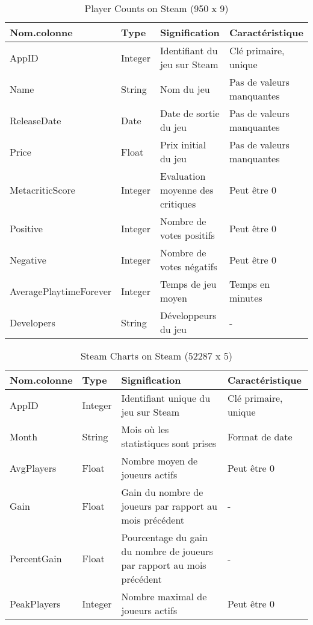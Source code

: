 \documentclass[mstat,12pt]{unswthesis}
\begin{document}
\begin{longtable}[t]{l>{\raggedright\arraybackslash}p{1cm}>{\raggedright\arraybackslash}p{4cm}>{\raggedright\arraybackslash}p{4cm}}
\caption{\label{tab:recuperation donnée}Player Counts on Steam (950 x 9)}\\
\toprule
Nom.colonne & Type & Signification & Caractéristique\\
\midrule
AppID & Integer & Identifiant du jeu sur Steam & Clé primaire, unique\\
Name & String & Nom du jeu & Pas de valeurs manquantes\\
ReleaseDate & Date & Date de sortie du jeu & Pas de valeurs manquantes\\
Price & Float & Prix initial du jeu & Pas de valeurs manquantes\\
MetacriticScore & Integer & Evaluation moyenne des critiques & Peut être 0\\
\addlinespace
Positive & Integer & Nombre de votes positifs & Peut être 0\\
Negative & Integer & Nombre de votes négatifs & Peut être 0\\
AveragePlaytimeForever & Integer & Temps de jeu moyen & Temps en minutes\\
Developers & String & Développeurs du jeu & -\\
\bottomrule
\end{longtable}

\begin{longtable}[t]{>{\raggedright\arraybackslash}p{2cm}>{\raggedright\arraybackslash}p{1cm}>{\raggedright\arraybackslash}p{8cm}>{\raggedright\arraybackslash}p{3cm}}
\caption{\label{tab:steam-charts-table}Steam Charts on Steam (52287 x 5)}\\
\toprule
Nom.colonne & Type & Signification & Caractéristique\\
\midrule
AppID & Integer & Identifiant unique du jeu sur Steam & Clé primaire, unique\\
Month & String & Mois où les statistiques sont prises & Format de date\\
AvgPlayers & Float & Nombre moyen de joueurs actifs & Peut être 0\\
Gain & Float & Gain du nombre de joueurs par rapport
                    au mois précédent & -\\
PercentGain & Float & Pourcentage du gain du nombre de joueurs
                    par rapport au mois précédent & -\\
\addlinespace
PeakPlayers & Integer & Nombre maximal de joueurs actifs & Peut être 0\\
\bottomrule
\end{longtable}
\end{document}
